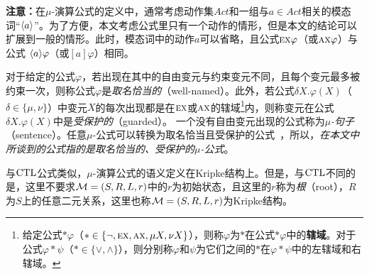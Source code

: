 \textbf{注意：}在$\mu$-演算公式的定义中，通常考虑动作集$Act$和一组与$a\in Act$相关的模态词“${\langle{a}\rangle}$”\cite{DBLP:journals/cacm/Kozen83,d1996uniform,d2000logical}。为了方便，本文考虑公式里只有一个动作的情形，但是本文的结论可以扩展到一般的情形。此时，模态词中的动作$a$可以省略，且公式$\textsc{e}\textsc{x}\varphi$（或$\textsc{a}\textsc{x} \varphi$）与公式 ${\langle{a}\rangle}\varphi$（或$[a]\varphi$）\cite{d2000logical}相同。


对于给定的公式$\varphi$，若出现在其中的自由变元与约束变元不同，且每个变元最多被约束一次，则称公式$\varphi$是\emph{取名恰当的}（well-named）。此外，若公式$\delta X.\varphi(X)$（$\delta \in \{\mu, \nu\}$）中变元$X$的每次出现都是在$\textsc{e}\textsc{x}$或$\textsc{a}\textsc{x}$的辖域\footnote{给定公式$*\varphi$（$*\in \{\neg, \textsc{e}\textsc{x},\textsc{a}\textsc{x}, \mu X, \nu X\}$），则称$\varphi$为$*$在公式$*\varphi$中的\textbf{辖域}。对于公式$\varphi * \psi$（$*\in \{\vee, \wedge\}$），则分别称$\varphi$和$\psi$为它们之间的$*$在$\varphi * \psi$中的左辖域和右辖域。}内，则称变元在公式$\delta X.\varphi(X)$中是\emph{受保护的}（guarded）。
一个没有自由变元出现的公式称为\emph{$\mu$-句子}（sentence）。任意$\mu$-公式可以转换为取名恰当且受保护的公式~\cite{janin1995automata}，所以，\emph{在本文中所谈到的公式指的是取名恰当的、受保护的$\mu$-公式}。

与$\textrm{CTL}$公式类似，$\mu$-演算公式的语义定义在Kripke结构上。但是，与$\textrm{CTL}$不同的是，这里不要求${\cal M}=(S,R,L,r)$中的$r$为初始状态，且这里的$r$称为\emph{根}（root），$R$为$S$上的任意二元关系，这里也称${\cal M}=(S,R,L,r)$为Kripke结构。

